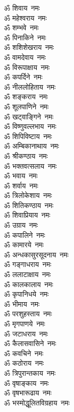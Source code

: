 \begin{multicols}{2}
\begin{flushleft}
ॐ शिवाय~नमः\\
ॐ महेश्वराय~नमः\\
ॐ शम्भवे~नमः\\
ॐ पिनाकिने~नमः\\
ॐ शशिशेखराय~नमः\\
ॐ वामदेवाय~नमः\\
ॐ विरूपाक्षाय~नमः\\
ॐ कपर्दिने~नमः\\
ॐ नीललोहिताय~नमः\\
ॐ शङ्कराय~नमः\hfill{}\\
ॐ शूलपाणिने~नमः\\
ॐ खट्वाङ्गिने~नमः\\
ॐ विष्णुवल्लभाय~नमः\\
ॐ शिपिविष्टाय~नमः\\
ॐ अम्बिकानाथाय~नमः\\
ॐ श्रीकण्ठाय~नमः\\
ॐ भक्तवत्सलाय~नमः\\
ॐ भवाय~नमः\\
ॐ शर्वाय~नमः\\
ॐ त्रिलोकेशाय~नमः\hfill{}\\
ॐ शितिकण्ठाय~नमः\\
ॐ शिवाप्रियाय~नमः\\
ॐ उग्राय~नमः\\
ॐ कपालिने~नमः\\
ॐ कामारये~नमः\\
ॐ अन्धकासुरसूदनाय~नमः\\
ॐ गङ्गाधराय~नमः\\
ॐ ललाटाक्षाय~नमः\\
ॐ कालकालाय~नमः\\
ॐ कृपानिधये~नमः\hfill{}\\
ॐ भीमाय~नमः\\
ॐ परशुहस्ताय~नमः\\
ॐ मृगपाणये~नमः\\
ॐ जटाधराय~नमः\\
ॐ कैलासवासिने~नमः\\
ॐ कवचिने~नमः\\
ॐ कठोराय~नमः\\
ॐ त्रिपुरान्तकाय~नमः\\
ॐ वृषाङ्काय~नमः\\
ॐ वृषभारूढाय~नमः\hfill{}\\
ॐ भस्मोद्धूलितविग्रहाय~नमः\\

\end{flushleft}
\end{multicols}
